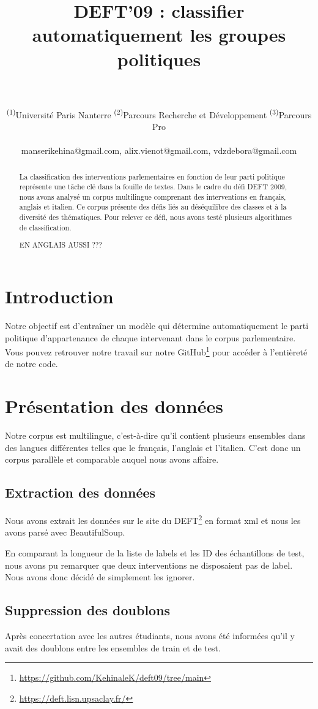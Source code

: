 \documentclass[11pt]{article}
\title{DEFT'09 : classifier automatiquement les groupes politiques}
\author{
  \text{MANSERI Kéhina\textsuperscript{(1)(2)}}
  \text{SIRVEN-VIENOT Alix\textsuperscript{(1)(2)}}
  \text{VAN-DEN-ZANDE Débora\textsuperscript{(1)(3)}}
\\
\\
  \textsuperscript{(1)}Université Paris Nanterre
  \textsuperscript{(2)}Parcours Recherche et Développement
  \textsuperscript{(3)}Parcours Pro
\\
\\
    \small {
    manserikehina@gmail.com, alix.vienot@gmail.com, vdzdebora@gmail.com
    }
\\
}
\begin{document}
\maketitle

\begin{abstract}
La classification des interventions parlementaires en fonction de leur parti politique représente une tâche clé dans la fouille de textes. Dans le cadre du défi DEFT 2009, nous avons analysé un corpus multilingue comprenant des interventions en français, anglais et italien. Ce corpus présente des défis liés au déséquilibre des classes et à la diversité des thématiques. Pour relever ce défi, nous avons testé plusieurs algorithmes de classification. 

EN ANGLAIS AUSSI ???


\end{abstract}

\section{Introduction}
Notre objectif est d'entraîner un modèle qui détermine automatiquement le parti politique d’appartenance de chaque intervenant dans le corpus parlementaire. 
Vous pouvez retrouver notre travail sur notre GitHub\footnote{\url{https://github.com/KehinaleK/deft09/tree/main}} pour accéder à l'entièreté de notre code.

\section{Présentation des données}
Notre corpus est multilingue, c'est-à-dire qu'il contient plusieurs ensembles dans des langues différentes telles que le français, l'anglais et l'italien. C'est donc un corpus parallèle et comparable auquel nous avons affaire. 

\subsection{Extraction des données}
Nous avons extrait les données sur le site du DEFT\footnote{\url{https://deft.lisn.upsaclay.fr/}} en format xml et nous les avons parsé avec BeautifulSoup. 

En comparant la longueur de la liste de labels et les ID des échantillons de test, nous avons pu remarquer que deux interventions ne disposaient pas de label. Nous avons donc décidé de simplement les ignorer.


\subsection{Suppression des doublons}
Après concertation avec les autres étudiants, nous avons été informées qu'il y avait des doublons entre les ensembles de train et de test.
\end{document}
